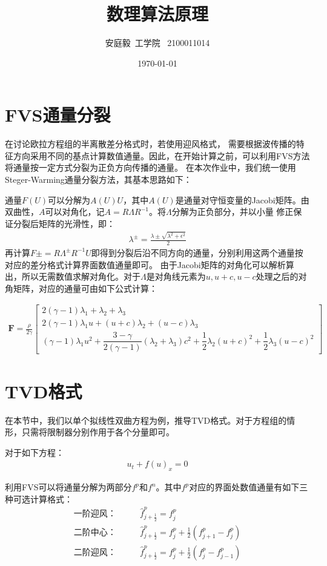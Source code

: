\documentclass[12pt, a4paper]{article}
\title{数理算法原理}
\author{安庭毅\ 工学院 \ 2100011014}
\date{\today} %
\begin{document}
\maketitle %
\section{FVS通量分裂}
在讨论欧拉方程组的半离散差分格式时，若使用迎风格式，
需要根据波传播的特征方向采用不同的基点计算数值通量。因此，在开始计算之前，可以利用FVS方法将通量按一定方式分裂为正负方向传播的通量。
在本次作业中，我们统一使用Steger-Warming通量分裂方法，其基本思路如下：

通量$F(U)$可以分解为$A(U)U$，其中$A(U)$是通量对守恒变量的Jacobi矩阵。由双曲性，$A$可以对角化，记$A=R\Lambda R^{-1}$。将$\Lambda$分解为正负部分，并以小量
修正保证分裂后矩阵的光滑性，即：
\begin{align}
    \lambda^{\pm} = \frac{\lambda\pm\sqrt{\lambda ^ 2 + \epsilon ^ 2}}{2} 
\end{align}
再计算$F\pm=R\Lambda^{\pm}R^{-1}U$即得到分裂后沿不同方向的通量，分别利用这两个通量按对应的差分格式计算界面数值通量即可。
由于Jacobi矩阵的对角化可以解析算出，所以无需数值求解对角化。对于$\Lambda$是对角线元素为$u, u+c, u-c$处理之后的对角矩阵，对应的通量可由如下公式计算：

\begin{align}
\mathbf{F} = \frac{\rho}{2\gamma}
\begin{bmatrix}
2(\gamma - 1)\lambda_1 + \lambda_2 + \lambda_3 \\
2(\gamma - 1)\lambda_1 u + (u + c)\lambda_2 + (u - c)\lambda_3 \\
(\gamma - 1)\lambda_1 u^2 + \dfrac{3 - \gamma}{2(\gamma - 1)}(\lambda_2 + \lambda_3)c^2 + \dfrac{1}{2}\lambda_2(u + c)^2 + \dfrac{1}{2}\lambda_3(u - c)^2
\end{bmatrix}
\end{align}

\section{TVD格式}
在本节中，我们以单个拟线性双曲方程为例，推导TVD格式。对于方程组的情形，只需将限制器分别作用于各个分量即可。

对于如下方程：
\begin{align}
    u_t + f(u)_x = 0 
\end{align}

利用FVS可以将通量分解为两部分$f^p$和$f^n$。其中$f^p$对应的界面处数值通量有如下三种可选计算格式：
\begin{align}
    \text{一阶迎风：} \qquad &\widehat{f}^p_{j+\frac{1}{2}} = f^p_{j} \\
    \text{二阶中心：} \qquad &\widehat{f}^p_{j+\frac{1}{2}} = f^p_{j} + \frac{1}{2}(f^p_{j+1}-f^p_j)\\
    \text{二阶迎风：} \qquad &\widehat{f}^p_{j+\frac{1}{2}} = f^p_{j} + \frac{1}{2}(f^p_{j}-f^p_{j-1})\\
\end{align}
\end{document}
